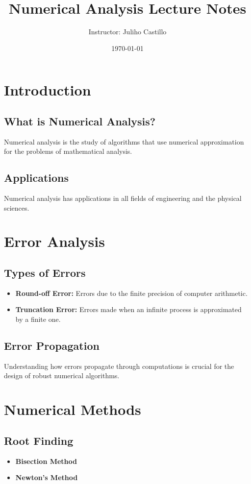 \documentclass[12pt]{article}
\title{Numerical Analysis Lecture Notes}
\author{Instructor: Juliho Castillo}
\date{\today}
\begin{document}
\maketitle
\tableofcontents
\newpage

\section{Introduction}
\subsection{What is Numerical Analysis?}
Numerical analysis is the study of algorithms that use numerical approximation for the problems of mathematical analysis.

\subsection{Applications}
Numerical analysis has applications in all fields of engineering and the physical sciences.

\section{Error Analysis}
\subsection{Types of Errors}
\begin{itemize}
    \item \textbf{Round-off Error:} Errors due to the finite precision of computer arithmetic.
    \item \textbf{Truncation Error:} Errors made when an infinite process is approximated by a finite one.
\end{itemize}

\subsection{Error Propagation}
Understanding how errors propagate through computations is crucial for the design of robust numerical algorithms.

\section{Numerical Methods}
\subsection{Root Finding}
\begin{itemize}
    \item \textbf{Bisection Method}
    \item \textbf{Newton's Method}
\end{itemize}
\end{document}
